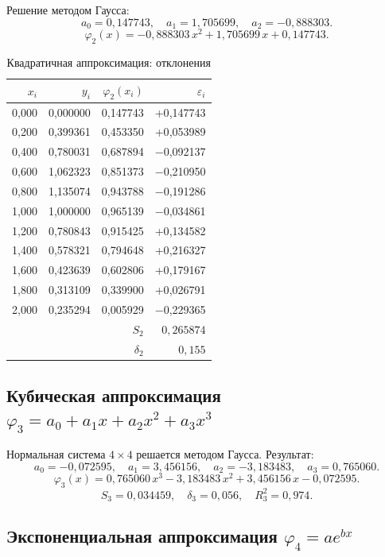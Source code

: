 \documentclass[12pt,a4paper]{article}
\begin{document}
Решение методом Гаусса:
\[
  a_0 = 0{,}147743, \quad a_1 = 1{,}705699, \quad a_2 = -0{,}888303.
\]
\[
  \varphi_2(x) = -0{,}888303\,x^2 + 1{,}705699\,x + 0{,}147743.
\]

\begin{table}[H]
\centering
\caption{Квадратичная аппроксимация: отклонения}
\begin{tabular}{r|r|r|r}
\toprule
$x_i$ & $y_i$ & $\varphi_2(x_i)$ & $\varepsilon_i$ \\
\midrule
0{,}000 & 0{,}000000 & 0{,}147743 & +0{,}147743 \\
0{,}200 & 0{,}399361 & 0{,}453350 & +0{,}053989 \\
0{,}400 & 0{,}780031 & 0{,}687894 & $-$0{,}092137 \\
0{,}600 & 1{,}062323 & 0{,}851373 & $-$0{,}210950 \\
0{,}800 & 1{,}135074 & 0{,}943788 & $-$0{,}191286 \\
1{,}000 & 1{,}000000 & 0{,}965139 & $-$0{,}034861 \\
1{,}200 & 0{,}780843 & 0{,}915425 & +0{,}134582 \\
1{,}400 & 0{,}578321 & 0{,}794648 & +0{,}216327 \\
1{,}600 & 0{,}423639 & 0{,}602806 & +0{,}179167 \\
1{,}800 & 0{,}313109 & 0{,}339900 & +0{,}026791 \\
2{,}000 & 0{,}235294 & 0{,}005929 & $-$0{,}229365 \\
\midrule
\multicolumn{3}{r|}{$S_2$} & $0{,}265874$ \\
\multicolumn{3}{r|}{$\delta_2$} & $0{,}155$ \\
\bottomrule
\end{tabular}
\end{table}

\subsection{Кубическая аппроксимация \texorpdfstring{$\varphi_3 = a_0+a_1x+a_2x^2+a_3x^3$}{}}

Нормальная система $4\times4$ решается методом Гаусса. Результат:
\[
  a_0 = -0{,}072595,\quad a_1 = 3{,}456156,\quad a_2 = -3{,}183483,\quad a_3 = 0{,}765060.
\]
\[
  \varphi_3(x) = 0{,}765060\,x^3 - 3{,}183483\,x^2 + 3{,}456156\,x - 0{,}072595.
\]
\[
  S_3 = 0{,}034459, \quad \delta_3 = 0{,}056, \quad R^2_3 = 0{,}974.
\]

\subsection{Экспоненциальная аппроксимация \texorpdfstring{$\varphi_4 = ae^{bx}$}{}}
\end{document}
